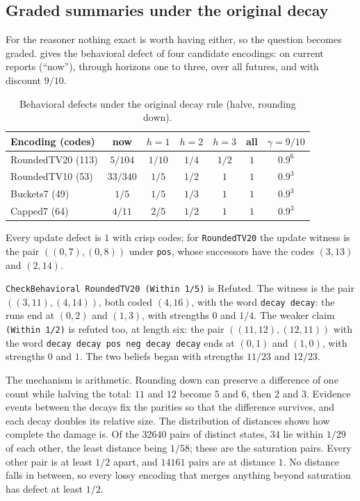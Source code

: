 \documentclass[11pt]{article}
\newcommand{\code}[1]{\texttt{#1}}
\theoremstyle{definition}
\theoremstyle{plain}
\begin{document}
\subsection{Graded summaries under the original decay}

For the reasoner nothing exact is worth having either, so the question becomes graded.
 gives the behavioral defect of four candidate encodings: on current reports
(``now''), through horizons one to three, over all futures, and with discount $9/10$.

\begin{table}[ht]
\centering\small
\begin{tabular}{lcccccc}
\toprule
Encoding (codes) & now & $h=1$ & $h=2$ & $h=3$ & all & $\gamma=9/10$\\
\midrule
RoundedTV20 (113) & $5/104$ & $1/10$ & $1/4$ & $1/2$ & $1$ & $0.9^6$\\
RoundedTV10 (53) & $33/340$ & $1/5$ & $1/2$ & $1$ & $1$ & $0.9^3$\\
Buckets7 (49) & $1/5$ & $1/5$ & $1/3$ & $1$ & $1$ & $0.9^3$\\
Capped7 (64) & $4/11$ & $2/5$ & $1/2$ & $1$ & $1$ & $0.9^3$\\
\bottomrule
\end{tabular}
\caption{Behavioral defects under the original decay rule (halve, rounding down).}\label{tab:ex1floor}
\end{table}

Every update defect is $1$ with crisp codes; for \code{RoundedTV20} the update witness is the pair
$((0,7),(0,8))$ under \code{pos}, whose successors have the codes $(3,13)$ and $(2,14)$.

\code{CheckBehavioral RoundedTV20 (Within 1/5)} is Refuted. The witness is the pair
$((3,11),(4,14))$, both coded $(4,16)$, with the word \code{decay decay}: the runs end at $(0,2)$
and $(1,3)$, with strengths $0$ and $1/4$. The weaker claim \code{(Within 1/2)} is refuted too, at
length six: the pair $((11,12),(12,11))$ with the word \code{decay decay pos neg decay decay} ends
at $(0,1)$ and $(1,0)$, with strengths $0$ and $1$. The two beliefs began with strengths $11/23$ and
$12/23$.

The mechanism is arithmetic. Rounding down can preserve a difference of one count while halving
the total: $11$ and $12$ become $5$ and $6$, then $2$ and $3$. Evidence events between the decays
fix the parities so that the difference survives, and each decay doubles its relative size. The
distribution of distances shows how complete the damage is. Of the $32640$ pairs of distinct
states, $34$ lie within $1/29$ of each other, the least distance being $1/58$; these are the
saturation pairs. Every other pair is at least $1/2$ apart, and $14161$ pairs are at distance
$1$. No distance falls in between, so every lossy encoding that merges anything beyond saturation
has defect at least $1/2$.
\end{document}
